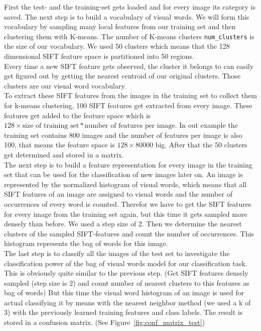 \documentclass[subfigure,epsfig,fleqn,float,numbers=noenddot]{scrartcl}
\begin{document}
First the test- and the training-set gets loaded and for every image its category is saved. The next step is to build a vocabulary
of visual words. We will form this vocabulary by sampling many local features from our training set and then clustering them with K-means. The number of K-means clusters \texttt{num\_clusters} is the size of our vocabulary. We used 50 clusters which means that the 128 dimensional SIFT feature space is partitioned into 50 regions.\\
Every time a new SIFT feature gets observed, the cluster it belongs to can easily get figured out by getting the nearest centroid of our original clusters. Those clusters are our visual word vocabulary.\\
To extract these SIFT features from the images in the training set to collect them for k-means clustering, 100 SIFT features get extracted from every image. These features get added to the feature space which is $128 \times \mbox{size of training set}*\mbox{number of features per image}$. In out example the training set contains 800 images and the number of features per image is also 100, that means the feature space is $128 \times 80000$ big. After that the 50 clusters get determined and stored in a matrix.\\
The next step is to build a feature representation for every image in the training set that can be used for the classification of new images later on. An image is represented by the normalized histogram of visual words, which means that all SIFT features of an image are assigned to visual words and the number of occurrences of every word is counted. Therefor we have to get the SIFT features for every image from the training set again, but this time it gets sampled more densely than before. We used a step size of 2. Then we determine the nearest clusters of the sampled SIFT-features and count the number of occurrences. This histogram represents the bag of words for this image.\\
The last step is to classify all the images of the test set to investigate the classification power of the bag of visual words model for our classification task. This is obviously quite similar to the previous step. (Get SIFT features densely sampled (step size is 2) and count number of nearest clusters to this features as bag of words) But this time the visual word histogram of an image is used for actual classifying it by means with the nearest neighbor method (we used a k of 3) with the previously learned training features and class labels. The result is stored in a confusion matrix. (See Figure~\ref{fig:conf_matrix_test})
\end{document}
